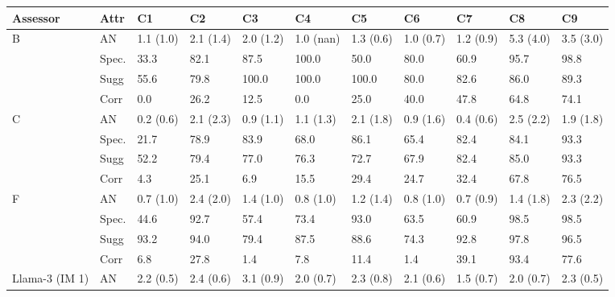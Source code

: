 \begin{table}[]
    \scriptsize
    \centering

\begin{tabular}{lllllllllll}
\toprule
         Assessor &            Attr &        C1 &        C2 &         C3 &        C4 &        C5 &        C6 &        C7 &        C8 &        C9 \\
\midrule
                B &         AN & 1.1 (1.0) & 2.1 (1.4) &  2.0 (1.2) & 1.0 (nan) & 1.3 (0.6) & 1.0 (0.7) & 1.2 (0.9) & 5.3 (4.0) & 3.5 (3.0) \\
                  &   Spec. &      33.3 &      82.1 &       87.5 &     100.0 &      50.0 &      80.0 &      60.9 &      95.7 &      98.8 \\
                  & Sugg &      55.6 &      79.8 &      100.0 &     100.0 &     100.0 &      80.0 &      82.6 &      86.0 &      89.3 \\
                  & Corr &       0.0 &      26.2 &       12.5 &       0.0 &      25.0 &      40.0 &      47.8 &      64.8 &      74.1 \\
                C &         AN & 0.2 (0.6) & 2.1 (2.3) &  0.9 (1.1) & 1.1 (1.3) & 2.1 (1.8) & 0.9 (1.6) & 0.4 (0.6) & 2.5 (2.2) & 1.9 (1.8) \\
                  &   Spec. &      21.7 &      78.9 &       83.9 &      68.0 &      86.1 &      65.4 &      82.4 &      84.1 &      93.3 \\
                  & Sugg &      52.2 &      79.4 &       77.0 &      76.3 &      72.7 &      67.9 &      82.4 &      85.0 &      93.3 \\
                  & Corr &       4.3 &      25.1 &        6.9 &      15.5 &      29.4 &      24.7 &      32.4 &      67.8 &      76.5 \\
                F &         AN & 0.7 (1.0) & 2.4 (2.0) &  1.4 (1.0) & 0.8 (1.0) & 1.2 (1.4) & 0.8 (1.0) & 0.7 (0.9) & 1.4 (1.8) & 2.3 (2.2) \\
                  &   Spec. &      44.6 &      92.7 &       57.4 &      73.4 &      93.0 &      63.5 &      60.9 &      98.5 &      98.5 \\
                  & Sugg &      93.2 &      94.0 &       79.4 &      87.5 &      88.6 &      74.3 &      92.8 &      97.8 &      96.5 \\
                  & Corr &       6.8 &      27.8 &        1.4 &       7.8 &      11.4 &       1.4 &      39.1 &      93.4 &      77.6 \\
   Llama-3 (IM 1) &         AN & 2.2 (0.5) & 2.4 (0.6) &  3.1 (0.9) & 2.0 (0.7) & 2.3 (0.8) & 2.1 (0.6) & 1.5 (0.7) & 2.0 (0.7) & 2.3 (0.5) \\

\end{tabular}
\end{table}
